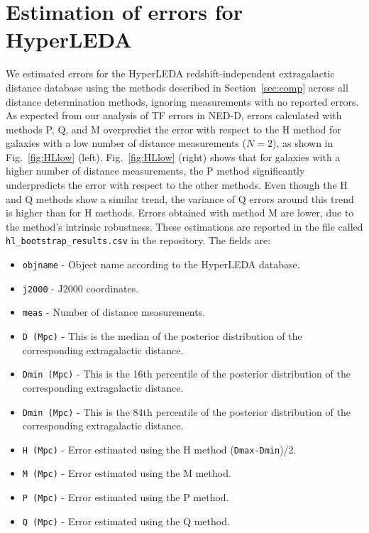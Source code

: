 \documentclass[a4paper,fleqn,usenatbib]{mnras}
\begin{document}
\section{Estimation of errors for HyperLEDA}
We estimated errors for the HyperLEDA redshift-independent extragalactic distance database using the methods described in Section~\ref{sec:comp} across all distance determination methods, ignoring measurements with no reported errors. As expected from our analysis of TF errors in NED-D, errors calculated with methods P, Q, and M overpredict the error with respect to the H method for galaxies with a low number of distance measurements ($N=2$), as shown in Fig.~\ref{fig:HLlow} (left). Fig.~\ref{fig:HLlow} (right) shows that for galaxies with a higher number of distance measurements, the P method significantly underpredicts the error with respect to the other methods. Even though the H and Q methods show a similar trend, the variance of Q errors around this trend is higher than for H methods. Errors obtained with method M are lower, due to the method's intrinsic robustness. These estimations are reported in the file called \texttt{hl\_bootstrap\_results.csv} in the repository. The fields are:
\begin{itemize}
\item \texttt{objname} - Object name according to the HyperLEDA database.
\item \texttt{j2000} - J2000 coordinates.
\item \texttt{meas} - Number of distance measurements.
\item \texttt{D (Mpc)} - This is the median of the posterior distribution of the corresponding extragalactic distance.
\item \texttt{Dmin (Mpc)} - This is the 16th percentile of the posterior distribution of the corresponding extragalactic distance.
\item \texttt{Dmin (Mpc)} - This is the 84th percentile of the posterior distribution of the corresponding extragalactic distance.
\item \texttt{H (Mpc)} - Error estimated using the H method (\texttt{Dmax-Dmin})/2.
\item \texttt{M (Mpc)} - Error estimated using the M method. 
\item \texttt{P (Mpc)} - Error estimated using the P method. 
\item \texttt{Q (Mpc)} - Error estimated using the Q method. 
\end{itemize}
\end{document}
